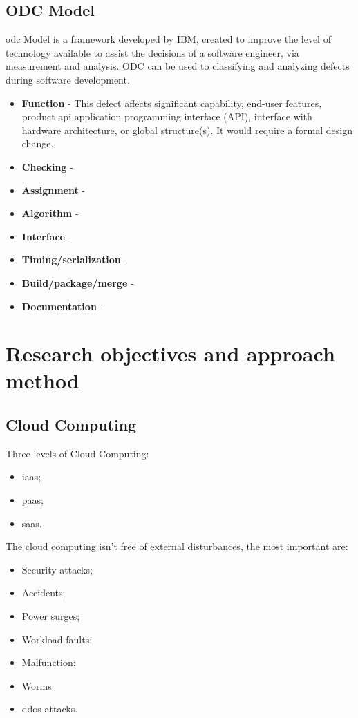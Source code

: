 \subsection{ODC Model}
\ac{odc} Model is a framework developed by IBM, created to improve the level of technology available to assist the decisions of a software engineer, via measurement and analysis.
ODC can be used to classifying and analyzing defects during software development.

\cite{bridge1998orthogonal}
\cite{chillarege2004orthogonal}

\begin{itemize}
	\item \textbf{Function} - This defect affects significant capability, end-user features, product \ac{api} application programming interface (API), interface with hardware architecture, or global structure(s). It would require a formal design change.
	\item \textbf{Checking} -
	\item \textbf{Assignment} -
	\item \textbf{Algorithm} -
	\item \textbf{Interface} -
	\item \textbf{Timing/serialization} -
	\item \textbf{Build/package/merge} -
	\item \textbf{Documentation} -
\end{itemize}


\newpage
\section{Research objectives and approach method}



\subsection{Cloud Computing}

Three levels of Cloud Computing:

\begin{itemize}
	\item \ac{iaas};
	\item \ac{paas};
	\item \ac{saas}.
\end{itemize}

The cloud computing isn't free of external disturbances\cite{wolter2012resilience}, the most important are:
\begin{itemize}
 	\item Security attacks;
 	\item Accidents;
 	\item Power surges;
 	\item Workload faults;
 	\item Malfunction;
 	\item Worms
 	\item \ac{ddos} attacks.
 \end{itemize}


